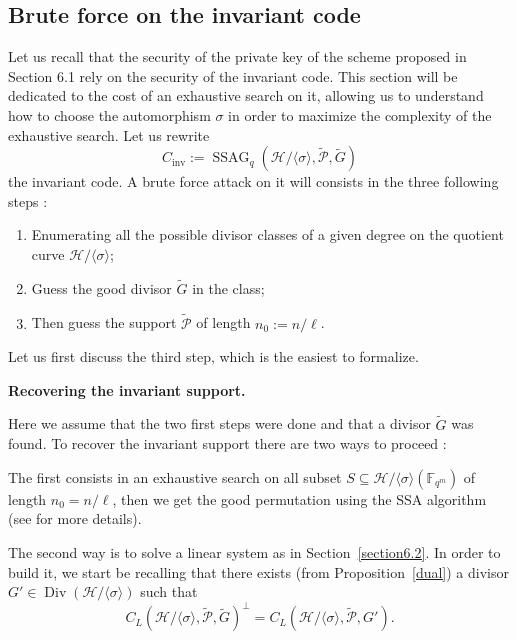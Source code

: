 \documentclass[10pt]{article}
\theoremstyle{definition}
\theoremstyle{definition}
\theoremstyle{definition}
\newcommand{\s}{\vspace{0.3cm}}
\newcommand{\fqm}{\mathbb{F}_{q^m}}
\newcommand{\su}{\subseteq}
\newcommand{\PR}{\mathcal{P}}
\newcommand{\Div}{\operatorname{Div}}
\newcommand{\ssag}{\operatorname{SSAG}}
\begin{document}
\s

\subsection{Brute force on the invariant code} \label{bruteforce}

\s

Let us recall that the security of the private key of the scheme proposed in Section 6.1 rely on the security of the invariant code. This section will be dedicated to the cost of an exhaustive search on it, allowing us to understand how to choose the automorphism $\sigma$ in order to maximize the complexity of the exhaustive search. Let us rewrite 
\[C_{\mathrm{inv}} := \ssag_q\left(\mathcal{H}/\langle \sigma \rangle,\tilde{\PR},\tilde{G}\right)\]
the invariant code. A brute force attack on it will consists in the three following steps :
\begin{enumerate}
\item Enumerating all the possible divisor classes of a given degree on the quotient curve $\mathcal{H}/\langle \sigma \rangle$;
\item Guess the good divisor $\tilde{G}$ in the class;
\item Then guess the support $\tilde{\PR}$ of length $n_0:=n/\ell$.
\end{enumerate}

Let us first discuss the third step, which is the easiest to formalize.

\s

\textbf{Recovering the invariant support.}

\s

Here we assume that the two first steps were done and that a divisor $\tilde{G}$ was found. To recover the invariant support there are two ways to proceed :

\s

The first consists in an exhaustive search on all subset $S \su \mathcal{H}/\langle \sigma \rangle\left(\fqm\right)$ of length $n_0=n/\ell$, then we get the good permutation using the SSA algorithm (see \cite{SSA} for more details).

\s

The second way is to solve a linear system as in Section~\ref{section6.2}. In order to build it, we start be recalling that there exists (from Proposition~\ref{dual}) a divisor $G' \in  \Div(\mathcal{H}/\langle \sigma \rangle)$ such that 
\[ C_L(\mathcal{H}/\langle \sigma \rangle,\tilde{\PR},\tilde{G})^{\perp} = C_L(\mathcal{H}/\langle \sigma \rangle,\tilde{\PR},G').\]
\end{document}
